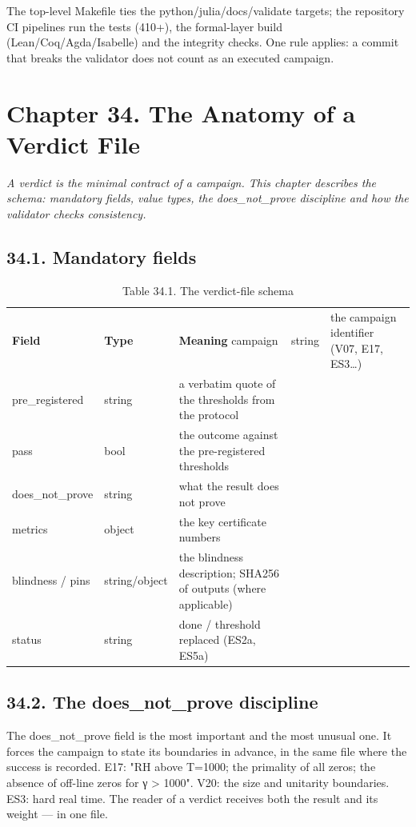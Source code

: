 \documentclass[11pt,a4paper]{article}
\begin{document}
The top-level Makefile ties the python/julia/docs/validate targets; the repository CI pipelines run the tests (410+), the formal-layer build (Lean/Coq/Agda/Isabelle) and the integrity checks. One rule applies: a commit that breaks the validator does not count as an executed campaign.

\section{Chapter 34. The Anatomy of a Verdict File}

\noindent\textit{\color{copper}A verdict is the minimal contract of a campaign. This chapter describes the schema: mandatory fields, value types, the does\_not\_prove discipline and how the validator checks consistency.}

\subsection{34.1. Mandatory fields}

\begin{table}[htbp]\centering\small
\caption{Table 34.1. The verdict-file schema}
\begin{tabular}{p{} p{} p{}}
\toprule
\textbf{Field} & \textbf{Type} & \textbf{Meaning}
\midrule
campaign & string & the campaign identifier (V07, E17, ES3…) \\
pre\_registered & string & a verbatim quote of the thresholds from the protocol \\
pass & bool & the outcome against the pre-registered thresholds \\
does\_not\_prove & string & what the result does not prove \\
metrics & object & the key certificate numbers \\
blindness / pins & string/object & the blindness description; SHA256 of outputs (where applicable) \\
status & string & done / threshold replaced (ES2a, ES5a) \\
\bottomrule
\end{tabular}
\end{table}

\subsection{34.2. The does\_not\_prove discipline}

The does\_not\_prove field is the most important and the most unusual one. It forces the campaign to state its boundaries in advance, in the same file where the success is recorded. E17: "RH above T=1000; the primality of all zeros; the absence of off-line zeros for γ > 1000". V20: the size and unitarity boundaries. ES3: hard real time. The reader of a verdict receives both the result and its weight — in one file.
\end{document}
